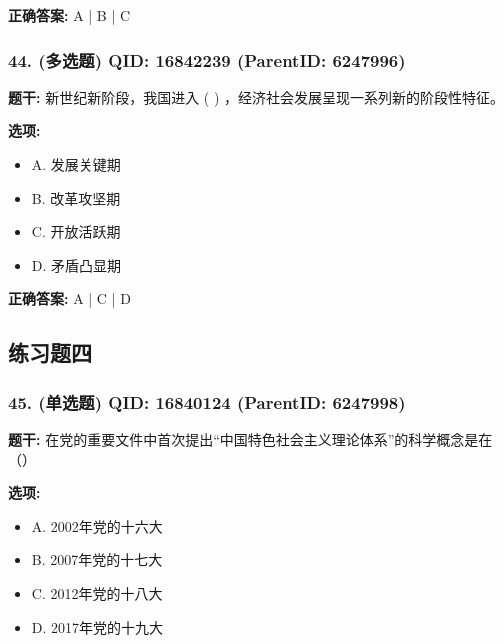 \documentclass[12pt,UTF8]{ctexart}
\begin{document}
\textbf{正确答案:}
A | B | C

\vspace{0.3em}\hrulefill\vspace{0.7em}

\subsubsection*{44. (多选题) \small QID: 16842239 (ParentID: 6247996)}

\textbf{题干:}
新世纪新阶段，我国进入 ( ) ，经济社会发展呈现一系列新的阶段性特征。



\textbf{选项:}
\begin{itemize}[leftmargin=*]

  \item A. 发展关键期

  \item B. 改革攻坚期

  \item C. 开放活跃期

  \item D. 矛盾凸显期

\end{itemize}

\textbf{正确答案:}
A | C | D

\vspace{0.3em}\hrulefill\vspace{0.7em}

\subsection*{练习题四}

\subsubsection*{45. (单选题) \small QID: 16840124 (ParentID: 6247998)}

\textbf{题干:}
在党的重要文件中首次提出“中国特色社会主义理论体系”的科学概念是在（）



\textbf{选项:}
\begin{itemize}[leftmargin=*]

  \item A. 2002年党的十六大

  \item B. 2007年党的十七大

  \item C. 2012年党的十八大

  \item D. 2017年党的十九大

\end{itemize}
\end{document}
